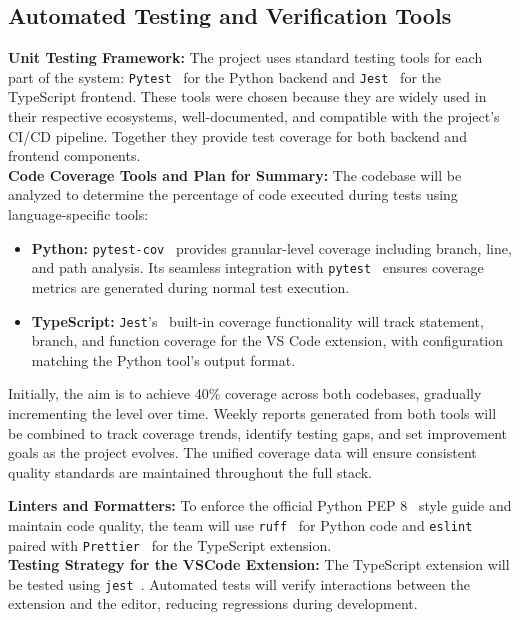 \documentclass[12pt, titlepage]{article}
\begin{document}
\subsection{Automated Testing and Verification Tools}

\textbf{Unit Testing Framework:} The project uses standard testing tools for each part of the system: \texttt{Pytest}~\cite{pytest} for the Python backend and \texttt{Jest}~\cite{jest} for the TypeScript frontend. These tools were chosen because they are widely used in their respective ecosystems, well-documented, and compatible with the project's CI/CD pipeline. Together they provide test coverage for both backend and frontend components.\\

\noindent\textbf{Code Coverage Tools and Plan for Summary:} The codebase will be analyzed to determine the percentage of code executed during tests using language-specific tools:

\begin{itemize}
    \item \textbf{Python:} \texttt{pytest-cov}~\cite{pytest-cov} provides granular-level coverage including branch, line, and path analysis. Its seamless integration with \texttt{pytest}~\cite{pytest} ensures coverage metrics are generated during normal test execution.
    
    \item \textbf{TypeScript:} \texttt{Jest}'s~\cite{jest} built-in coverage functionality will track statement, branch, and function coverage for the VS Code extension, with configuration matching the Python tool's output format.
\end{itemize}

Initially, the aim is to achieve 40\% coverage across both codebases, gradually incrementing the level over time. Weekly reports generated from both tools will be combined to track coverage trends, identify testing gaps, and set improvement goals as the project evolves. The unified coverage data will ensure consistent quality standards are maintained throughout the full stack.

\noindent\textbf{Linters and Formatters:} To enforce the official
Python PEP 8~\cite{pep8} style guide and maintain code quality, the team will use
\texttt{ruff}~\cite{ruff} for Python code and
\texttt{eslint}~\cite{eslint} paired with
\texttt{Prettier}~\cite{prettier} for the TypeScript extension.\\

\noindent\textbf{Testing Strategy for the VSCode Extension:} The
TypeScript extension will be tested using \texttt{jest}~\cite{jest}.
Automated tests will verify interactions between the extension and
the editor, reducing regressions during development.\\
\end{document}
